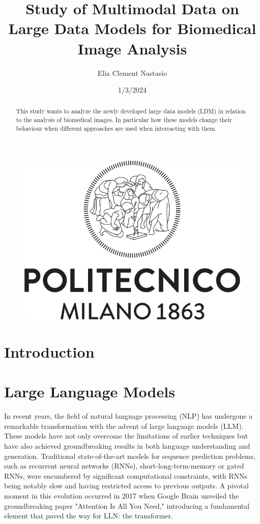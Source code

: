 \documentclass[a4paper,12pt]{article}
\title{Study of Multimodal Data on Large Data Models for Biomedical Image Analysis}
\begin{document}
\author{Elia Clement Nastasio}
\date{1/3/2024}
\begin{figure}
    \includegraphics[width=\linewidth]{Imm/polimi_logo.png}
  \end{figure}

\maketitle

\begin{abstract} 
This study wants to analyze the newly developed large data models (LDM) in relation to the analysis of 
biomedical images. In particular how these models change their behaviour when different approaches are 
used when interracting with them.
\end{abstract} 

\tableofcontents

\section{Introduction} 
\section{Large Language Models}
In recent years, the field of natural language processing (NLP) has undergone a remarkable transformation with the 
advent of large language models (LLM). These models have not only overcome the limitations of earlier techniques but 
have also achieved groundbreaking results in both language understanding and generation. Traditional state-of-the-art 
models for sequence prediction problems, such as recurrent neural networks (RNNs), short-long-term-memory or gated RNNs, 
were encumbered by significant computational constraints, with RNNs being notably slow and having restricted access to previous outputs.
A pivotal moment in this evolution occurred in 2017 when Google Brain unveiled the groundbreaking paper 
"Attention Is All You Need," introducing a fundamental element that paved the way for LLN: the transformer.
\end{document}
